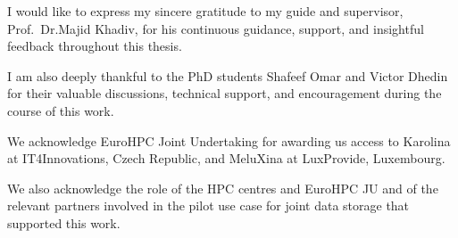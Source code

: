 I would like to express my sincere gratitude to my guide and supervisor, Prof.\@~Dr.\@ Majid Khadiv, for his continuous guidance, support, and insightful feedback throughout this thesis.

I am also deeply thankful to the PhD students Shafeef Omar and Victor Dhedin for their valuable discussions, technical support, and encouragement during the course of this work.

We acknowledge EuroHPC Joint Undertaking for awarding us access to Karolina at IT4Innovations, Czech Republic, and MeluXina at LuxProvide, Luxembourg.

We also acknowledge the role of the HPC centres and EuroHPC JU and of the relevant partners involved in the pilot use case for joint data storage that supported this work.
